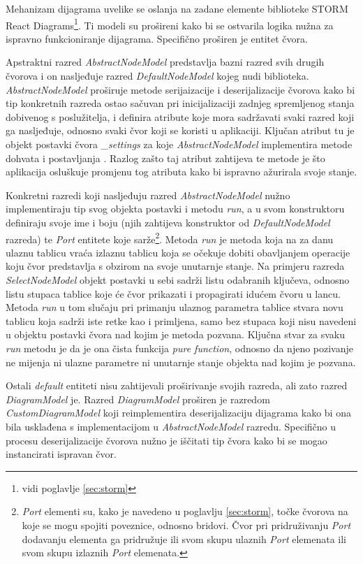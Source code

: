 \documentclass[times, utf8, diplomski, numeric]{fer}
\begin{document}
Mehanizam dijagrama uvelike se oslanja na zadane  elemente biblioteke STORM React Diagrams\footnote{vidi poglavlje \ref{sec:storm}}.
Ti modeli su prošireni kako bi se ostvarila logika nužna za ispravno funkcioniranje dijagrama.
Specifično proširen je entitet čvora.

Apstraktni razred \emph{AbstractNodeModel} predstavlja bazni razred svih drugih čvorova i on nasljeđuje razred \emph{DefaultNodeModel} kojeg nudi biblioteka.
\emph{AbstractNodeModel} proširuje metode serijaizacije i deserijalizacije čvorova kako bi tip konkretnih razreda ostao sačuvan pri inicijalizaciji zadnjeg spremljenog stanja dobivenog s poslužitelja, i definira atribute koje mora sadržavati svaki razred koji ga nasljeđuje, odnosno svaki čvor koji se koristi u aplikaciji.
Ključan atribut tu je objekt postavki čvora \emph{\_settings} za koje \emph{AbstractNodeModel} implementira metode dohvata  i postavljanja .
Razlog zašto taj atribut zahtijeva te metode je što aplikacija osluškuje promjenu tog atributa kako bi ispravno ažurirala svoje stanje.

Konkretni razredi koji nasljeđuju razred \emph{AbstractNodeModel} nužno implementiraju tip svog objekta postavki i metodu \emph{run}, a u svom konstruktoru definiraju svoje ime i boju (njih zahtijeva konstruktor od \emph{DefaultNodeModel} razreda) te \emph{Port} entitete koje sarže\footnote{
    \emph{Port} elementi su, kako je navedeno u poglavlju \ref{sec:storm}, točke čvorova na koje se mogu spojiti poveznice, odnosno bridovi.
    Čvor pri pridruživanju \emph{Port} dodavanju elementa ga pridružuje ili svom skupu ulaznih \emph{Port} elemenata ili svom skupu izlaznih \emph{Port} elemenata.
}.
Metoda \emph{run} je metoda koja na za danu ulaznu tablicu vraća izlaznu tablicu koja se očekuje dobiti obavljanjem operacije koju čvor predstavlja s obzirom na svoje unutarnje stanje.
Na primjeru razreda \emph{SelectNodeModel} objekt postavki u sebi sadrži listu odabranih ključeva, odnosno listu stupaca tablice koje će čvor prikazati i propagirati idućem čvoru u lancu.
Metoda \emph{run} u tom slučaju pri primanju ulaznog parametra tablice stvara novu tablicu koja sadrži iste retke kao i primljena, samo bez stupaca koji nisu navedeni u objektu postavki čvora nad kojim je metoda pozvana. 
Ključna stvar za svaku \emph{run} metodu je da je ona čista funkcija \emph{pure function}, odnosno da njeno pozivanje ne mijenja ni ulazne parametre ni unutarnje stanje objekta nad kojim je pozvana.

Ostali \emph{default} entiteti nisu zahtijevali proširivanje svojih razreda, ali zato razred \emph{DiagramModel} je.
Razred \emph{DiagramModel} proširen je razredom \emph{CustomDiagramModel} koji reimplementira deserijalizaciju dijagrama kako bi ona bila usklađena s implementacijom u \emph{AbstractNodeModel} razredu.
Specifično u procesu deserijalizacije čvorova nužno je iščitati tip čvora kako bi se mogao instancirati ispravan čvor.
\end{document}
